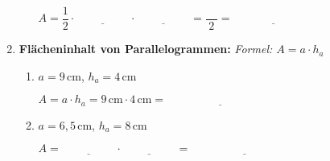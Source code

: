 \begin{enumerate}[label=\arabic*.]
\begin{enumerate}[label=\alph*)]
        $A = \dfrac{1}{2} \cdot \underline{\hspace{2cm}} \cdot \underline{\hspace{2cm}} = \dfrac{\phantom{00}}{2} = \underline{\hspace{3cm}}$
    \end{enumerate}

    \vspace{1cm}

    \item \textbf{Flächeninhalt von Parallelogrammen:}
    \textit{Formel: $A = a \cdot h_a$}
    \vspace{0.5cm}

    \begin{enumerate}[label=\alph*)]
        \item $a = 9\,\text{cm}$, $h_a = 4\,\text{cm}$

        $A = a \cdot h_a = 9\,\text{cm} \cdot 4\,\text{cm} = \underline{\hspace{4cm}}$

        \vspace{0.5cm}

        \item $a = 6{,}5\,\text{cm}$, $h_a = 8\,\text{cm}$

        $A = \underline{\hspace{2cm}} \cdot \underline{\hspace{2cm}} = \underline{\hspace{4cm}}$
    \end{enumerate}
\end{enumerate}